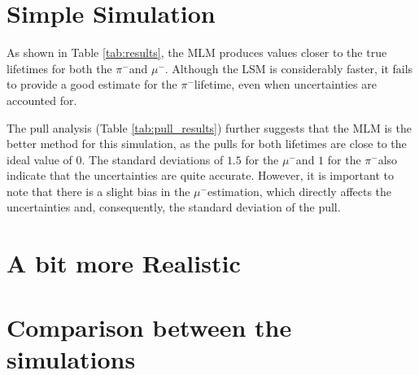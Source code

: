 \documentclass[11pt, a4paper, oneside]{book}
\newcommand{\pion}{$\pi^{-}$}
\newcommand{\muon}{$\mu^{-}$}
\begin{document}
\section{Simple Simulation}
As shown in Table \ref{tab:results}, the MLM produces values closer to the true lifetimes for both the \pion and \muon. Although the LSM is considerably faster, it fails to provide a good estimate for the \pion lifetime, even when uncertainties are accounted for.

The pull analysis (Table \ref{tab:pull_results}) further suggests that the MLM is the better method for this simulation, as the pulls for both lifetimes are close to the ideal value of 0. The standard deviations of $1.5$ for the \muon and $1$ for the \pion also indicate that the uncertainties are quite accurate. However, it is important to note that there is a slight bias in the \muon estimation, which directly affects the uncertainties and, consequently, the standard deviation of the pull.

\section{A bit more Realistic}
\section{Comparison between the simulations}


\end{document}
